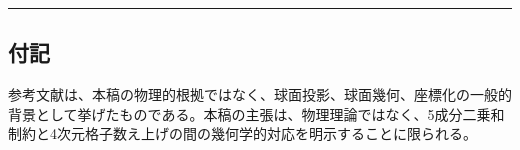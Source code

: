 \documentclass[
]{ltjsarticle}
\begin{document}
\begin{center}\rule{0.5\linewidth}{0.5pt}\end{center}

\subsection{付記}\label{ux4ed8ux8a18}

参考文献は、本稿の物理的根拠ではなく、球面投影、球面幾何、座標化の一般的背景として挙げたものである。本稿の主張は、物理理論ではなく、5成分二乗和制約と4次元格子数え上げの間の幾何学的対応を明示することに限られる。
\end{document}
